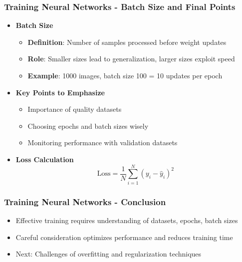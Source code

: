 \documentclass{beamer}
\begin{document}
\begin{frame}[fragile]
    \frametitle{Training Neural Networks - Batch Size and Final Points}
    \begin{itemize}
        \item \textbf{Batch Size}
        \begin{itemize}
            \item \textbf{Definition}: Number of samples processed before weight updates
            \item \textbf{Role}: Smaller sizes lead to generalization, larger sizes exploit speed
            \item \textbf{Example}: 1000 images, batch size 100 = 10 updates per epoch
        \end{itemize}
        
        \item \textbf{Key Points to Emphasize}
        \begin{itemize}
            \item Importance of quality datasets
            \item Choosing epochs and batch sizes wisely
            \item Monitoring performance with validation datasets
        \end{itemize}
        
        \item \textbf{Loss Calculation}
        \begin{equation}
            \text{Loss} = \frac{1}{N} \sum_{i=1}^{N}(y_i - \hat{y}_i)^2 
        \end{equation}
    \end{itemize}
\end{frame}

\begin{frame}[fragile]
    \frametitle{Training Neural Networks - Conclusion}
    \begin{itemize}
        \item Effective training requires understanding of datasets, epochs, batch sizes
        \item Careful consideration optimizes performance and reduces training time
        \item Next: Challenges of overfitting and regularization techniques
    \end{itemize}
\end{frame}
\end{document}
